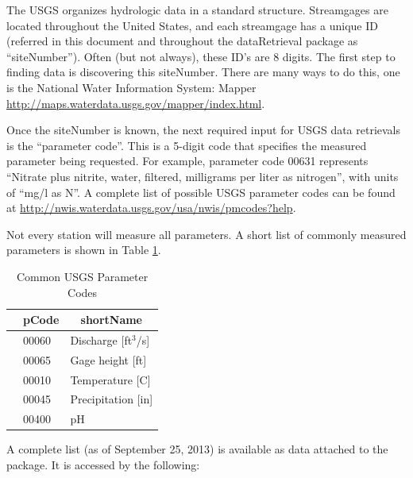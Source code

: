 \documentclass[a4paper,11pt]{article}\usepackage[]{graphicx}\usepackage[]{color}
\begin{document}
The USGS organizes hydrologic data in a standard structure.  Streamgages are located throughout the United States, and each streamgage has a unique ID (referred in this document and throughout the dataRetrieval package as \enquote{siteNumber}).  Often (but not always), these ID's are 8 digits.  The first step to finding data is discovering this siteNumber. There are many ways to do this, one is the National Water Information System: Mapper \url{http://maps.waterdata.usgs.gov/mapper/index.html}.

Once the siteNumber is known, the next required input for USGS data retrievals is the \enquote{parameter code}.  This is a 5-digit code that specifies the measured parameter being requested.  For example, parameter code 00631 represents \enquote{Nitrate plus nitrite, water, filtered, milligrams per liter as nitrogen}, with units of \enquote{mg/l as N}. A complete list of possible USGS parameter codes can be found at \url{http://nwis.waterdata.usgs.gov/usa/nwis/pmcodes?help}.

Not every station will measure all parameters. A short list of commonly measured parameters is shown in Table \ref{tab:params}.


\begin{table}[ht]
\caption{Common USGS Parameter Codes} 
\label{tab:params}
{\footnotesize
\begin{tabular}{rll}
  \hline
 & \multicolumn{1}{c}{\textbf{\textsf{pCode}}} & \multicolumn{1}{c}{\textbf{\textsf{shortName}}} \\ 
  \hline
 & 00060 & Discharge [ft$^3$/s] \\ 
  [5pt] & 00065 & Gage height [ft] \\ 
  [5pt] & 00010 & Temperature [C] \\ 
  [5pt] & 00045 & Precipitation [in] \\ 
  [5pt] & 00400 & pH \\ 
   \hline
\end{tabular}
}
\end{table}


A complete list (as of September 25, 2013) is available as data attached to the package. It is accessed by the following:
\end{document}
